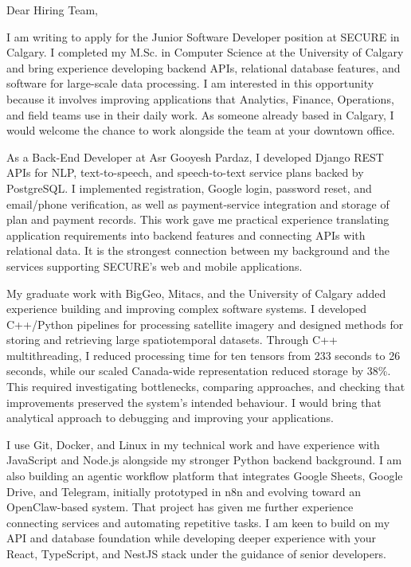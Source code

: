 \documentclass[11pt]{letter}
\begin{document}
\begin{letter}{}
\opening{Dear Hiring Team,}

I am writing to apply for the Junior Software Developer position at SECURE in Calgary. I completed my M.Sc. in Computer Science at the University of Calgary and bring experience developing backend APIs, relational database features, and software for large-scale data processing. I am interested in this opportunity because it involves improving applications that Analytics, Finance, Operations, and field teams use in their daily work. As someone already based in Calgary, I would welcome the chance to work alongside the team at your downtown office.

As a Back-End Developer at Asr Gooyesh Pardaz, I developed Django REST APIs for NLP, text-to-speech, and speech-to-text service plans backed by PostgreSQL. I implemented registration, Google login, password reset, and email/phone verification, as well as payment-service integration and storage of plan and payment records. This work gave me practical experience translating application requirements into backend features and connecting APIs with relational data. It is the strongest connection between my background and the services supporting SECURE's web and mobile applications.

My graduate work with BigGeo, Mitacs, and the University of Calgary added experience building and improving complex software systems. I developed C++/Python pipelines for processing satellite imagery and designed methods for storing and retrieving large spatiotemporal datasets. Through C++ multithreading, I reduced processing time for ten tensors from 233 seconds to 26 seconds, while our scaled Canada-wide representation reduced storage by 38\%. This required investigating bottlenecks, comparing approaches, and checking that improvements preserved the system's intended behaviour. I would bring that analytical approach to debugging and improving your applications.

I use Git, Docker, and Linux in my technical work and have experience with JavaScript and Node.js alongside my stronger Python backend background. I am also building an agentic workflow platform that integrates Google Sheets, Google Drive, and Telegram, initially prototyped in n8n and evolving toward an OpenClaw-based system. That project has given me further experience connecting services and automating repetitive tasks. I am keen to build on my API and database foundation while developing deeper experience with your React, TypeScript, and NestJS stack under the guidance of senior developers.


\end{letter}
\end{document}
